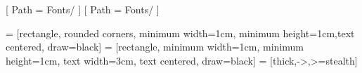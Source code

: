 \usepackage{xeCJK}
\usepackage{fontspec}
    [
        Path = Fonts/
    ]
    [
        Path = Fonts/
    ]

\usepackage[vmargin=1in]{geometry}
\pagestyle{empty}

\renewcommand\thesection{\S}
\renewcommand\thesubsection{\arabic{subsection}}
\renewcommand{\arraystretch}{1.1}

\usepackage{amsmath, amsfonts, amssymb, amsthm}
    \newtheorem{ax}{Axiom}
    \newtheorem*{cl}{Corollary}
    \newtheorem*{con}{Conclusion}
    \newtheorem{clm}{Claim}
    \newtheorem{df}{Definition}
    \newtheorem{ex}{Example}
    \newtheorem{exs}{Exercise}
    \newtheorem{lm}{Lemma}
    \newtheorem{pr}{Principle}
    \newtheorem{pp}{Property}
    \newtheorem{pro}{Problem}
    \newtheorem{prop}{Proposition}
    \newtheorem*{rem}{Remark}
    \newtheorem{sol}{Solution}
    \newtheorem{thm}{Theorem}
    \newtheorem{ans}{Answer}

\usepackage{enumerate}
\usepackage{graphicx}
\usepackage{xcolor}
\usepackage{url}
\usepackage{subcaption}
\usepackage[justification=centering]{caption}
\usepackage{float}
\usepackage{multicol}
\usepackage{tikz}
\usetikzlibrary{shapes.geometric, arrows}
 = [rectangle, rounded corners, minimum width=1cm, minimum height=1cm,text centered, draw=black]
 = [rectangle, minimum width=1cm, minimum height=1cm, text width=3cm, text centered, draw=black]
 = [thick,->,>=stealth]
